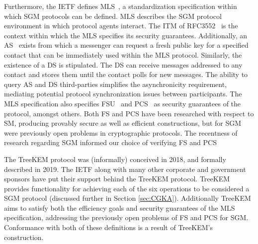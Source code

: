 \documentclass[runningheads]{llncs}
\newcommand{\Abrev}[1]{\gls{#1}}
\begin{document}
Furthermore, the \Abrev{IETF} defines \Abrev{MLS}\ \cite{Omara2020}, a standardization specification within which \Abrev{SGM} protocols can be defined.
\Abrev{MLS} describes the \Abrev{SGM} protocol environment in which protocol agents interact.
The \Abrev{ITM} of RFC3552~\cite{rescorla2003rfc3552} is the context within which the \Abrev{MLS} specifies its security guarantees.
Additionally, an \Abrev{AS}~\cite{perlman1999overview} exists from which a messenger can request a fresh public key for a specified contact that can be immediately used within the \Abrev{MLS} protocol.
Similarly, the existence of a \Abrev{DS} is stipulated. 
The \Abrev{DS} can receive messages addressed to any contact and stores them until the contact polls for new messages.
The ability to query \Abrev{AS} and \Abrev{DS} third-parties simplifies the asynchronicity requirement, mediating potential protocol synchronization issues between participants.
The \Abrev{MLS} specification also specifies \Abrev{FSU}~\cite{Omara2020} and \Abrev{PCS}~\cite{cohn2016post} as security guarantees of the protocol, amongst others.
Both \Abrev{FS} and \Abrev{PCS} have been researched with respect to \Abrev{SM}, producing provably secure as well as efficient constructions, but for \Abrev{SGM} were previously open problems in cryptographic protocols.
The recentness of research regarding \Abrev{SGM} informed our choice of verifying \Abrev{FS} and \Abrev{PCS} 

The TreeKEM protocol \cite{bhargavan:hal-02425247} was (informally) conceived in 2018, and formally described in 2019.
The \Abrev{IETF} along with many other corporate and government sponsors have put their support behind the TreeKEM protocol.
TreeKEM provides functionality for achieving each of the six operations to be considered a \Abrev{SGM} protocol (discussed further in Section \ref{sec:CGKA}).
Additionally TreeKEM aims to satisfy both the efficiency goals and security guarantees of the \Abrev{MLS} specification, addressing the previously open problems of \Abrev{FS} and \Abrev{PCS} for \Abrev{SGM}.
Conformance with both of these definitions is a result of TreeKEM's construction.
\end{document}
